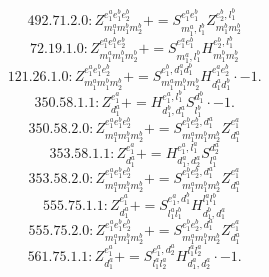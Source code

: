 \documentclass[letterpaper,10pt,fleqn,leqno,onecolumn]{article}
\begin{document}
\begin{equation} \;\;\;\;\;\;  492.71.2.0: Z^{e_{1}^{a}e_{1}^{b}e_{2}^{b}}_{m_{1}^{a}m_{1}^{b}m_{2}^{b}}+=S^{e_{1}^{a}e_{1}^{b}}_{m_{1}^{a},l_{1}^{b}}Z^{e_{2}^{b},l_{1}^{b}}_{m_{1}^{b}m_{2}^{b}} \end{equation}
\begin{equation} \;\;\;\;\;\;  72.19.1.0: Z^{e_{1}^{a}e_{1}^{b}e_{2}^{b}}_{m_{1}^{a}m_{1}^{b}m_{2}^{b}}+=S^{e_{1}^{a}e_{1}^{b}}_{m_{1}^{a},l_{1}^{b}}H^{e_{2}^{b},l_{1}^{b}}_{m_{1}^{b}m_{2}^{b}} \end{equation}
\begin{equation} \;\;\;\;\;\;  121.26.1.0: Z^{e_{1}^{a}e_{1}^{b}e_{2}^{b}}_{m_{1}^{a}m_{1}^{b}m_{2}^{b}}+=S^{e_{1}^{b},d_{1}^{a}d_{1}^{b}}_{m_{1}^{a}m_{1}^{b}m_{2}^{b}}H^{e_{1}^{a}e_{2}^{b}}_{d_{1}^{a}d_{1}^{b}}\cdot -1. \end{equation}
\begin{equation} \;\;\;\;\;\;  350.58.1.1: Z^{e_{1}^{a}}_{d_{1}^{a}}+=H^{e_{1}^{a},l_{1}^{b}}_{d_{1}^{b},d_{1}^{a}}S^{d_{1}^{b}}_{l_{1}^{b}}\cdot -1. \end{equation}
\begin{equation} \;\;\;\;\;\;  350.58.2.0: Z^{e_{1}^{a}e_{1}^{b}e_{2}^{b}}_{m_{1}^{a}m_{1}^{b}m_{2}^{b}}+=S^{e_{1}^{b}e_{2}^{b},d_{1}^{a}}_{m_{1}^{a}m_{1}^{b}m_{2}^{b}}Z^{e_{1}^{a}}_{d_{1}^{a}} \end{equation}
\begin{equation} \;\;\;\;\;\;  353.58.1.1: Z^{e_{1}^{a}}_{d_{1}^{a}}+=H^{e_{1}^{a},l_{1}^{a}}_{d_{1}^{a},d_{2}^{a}}S^{d_{2}^{a}}_{l_{1}^{a}} \end{equation}
\begin{equation} \;\;\;\;\;\;  353.58.2.0: Z^{e_{1}^{a}e_{1}^{b}e_{2}^{b}}_{m_{1}^{a}m_{1}^{b}m_{2}^{b}}+=S^{e_{1}^{b}e_{2}^{b},d_{1}^{a}}_{m_{1}^{a}m_{1}^{b}m_{2}^{b}}Z^{e_{1}^{a}}_{d_{1}^{a}} \end{equation}
\begin{equation} \;\;\;\;\;\;  555.75.1.1: Z^{e_{1}^{a}}_{d_{1}^{a}}+=S^{e_{1}^{a},d_{1}^{b}}_{l_{1}^{a}l_{1}^{b}}H^{l_{1}^{a}l_{1}^{b}}_{d_{1}^{b},d_{1}^{a}} \end{equation}
\begin{equation} \;\;\;\;\;\;  555.75.2.0: Z^{e_{1}^{a}e_{1}^{b}e_{2}^{b}}_{m_{1}^{a}m_{1}^{b}m_{2}^{b}}+=S^{e_{1}^{b}e_{2}^{b},d_{1}^{a}}_{m_{1}^{a}m_{1}^{b}m_{2}^{b}}Z^{e_{1}^{a}}_{d_{1}^{a}} \end{equation}
\begin{equation} \;\;\;\;\;\;  561.75.1.1: Z^{e_{1}^{a}}_{d_{1}^{a}}+=S^{e_{1}^{a},d_{2}^{a}}_{l_{1}^{a}l_{2}^{a}}H^{l_{1}^{a}l_{2}^{a}}_{d_{1}^{a},d_{2}^{a}}\cdot -1. \end{equation}
\end{document}

